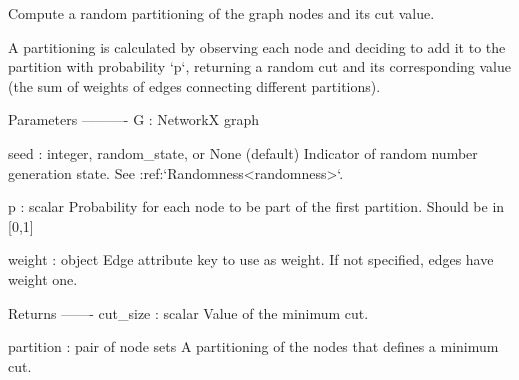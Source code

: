\begin{DoxyVerb}Compute a random partitioning of the graph nodes and its cut value.

A partitioning is calculated by observing each node
and deciding to add it to the partition with probability `p`,
returning a random cut and its corresponding value (the
sum of weights of edges connecting different partitions).

Parameters
----------
G : NetworkX graph

seed : integer, random_state, or None (default)
    Indicator of random number generation state.
    See :ref:`Randomness<randomness>`.

p : scalar
    Probability for each node to be part of the first partition.
    Should be in [0,1]

weight : object
    Edge attribute key to use as weight. If not specified, edges
    have weight one.

Returns
-------
cut_size : scalar
    Value of the minimum cut.

partition : pair of node sets
    A partitioning of the nodes that defines a minimum cut.
\end{DoxyVerb}
 